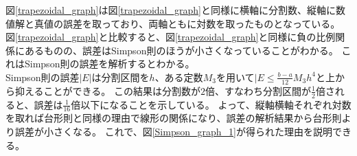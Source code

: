 \documentclass[a4paper]{jsarticle}
\begin{document}
図\ref{trapezoidal_graph}は図\ref{trapezoidal_graph}と同様に横軸に分割数、縦軸に数値解と真値の誤差を取っており、両軸ともに対数を取ったものとなっている。
図\ref{trapezoidal_graph}と比較すると、図\ref{trapezoidal_graph}と同様に負の比例関係にあるものの、誤差はSimpson則のほうが小さくなっていることがわかる。
これはSimpson則の誤差を解析するとわかる。 \\
\indent Simpson則の誤差\(|E|\)は分割区間を\(h\)、ある定数\(M_3\)を用いて\(|E \leq \frac{b - a}{12}M_3h^4\)と上から抑えることができる。
この結果は分割数が\(2\)倍、すなわち分割区間が\(\frac{1}{2}\)倍されると、誤差は\(\frac{1}{16}\)倍以下になることを示している。
よって、縦軸横軸それぞれ対数を取れば台形則と同様の理由で線形の関係になり、誤差の解析結果から台形則より誤差が小さくなる。
これで、図\ref{Simpson_graph_1}が得られた理由を説明できる。
\end{document}
